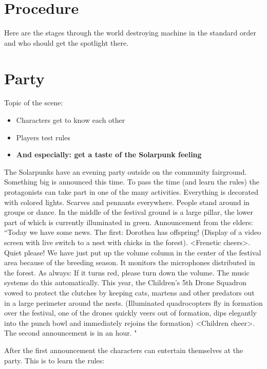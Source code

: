 \section{Procedure}
Here are the stages through the world destroying machine in the standard order and who should get the spotlight there.



\section{Party}

Topic of the scene: 
\begin{itemize}
\item Characters get to know each other
\item Players test rules
\item \bf{And especially: get a taste of the Solarpunk feeling}
\end{itemize}

The Solarpunks have an evening party outside on the community fairground. Something big is announced this time. To pass the time (and learn the rules) the protagonists can take part in one of the many activities. 
Everything is decorated with colored lights. Scarves and pennants everywhere. People stand around in groups or dance. In the middle of the festival ground is a large pillar, the lower part of which is currently illuminated in green.
Announcement from the elders: “Today we have some news. The first: Dorothea has offspring! (Display of a video screen with live switch to a nest with chicks in the forest). <Frenetic cheers>. Quiet please! We have just put up the volume column in the center of the festival area because of the breeding season.
It monitors the microphones distributed in the forest.
As always: If it turns red, please turn down the volume. The music systems do this automatically. This year, the Children's 5th Drone Squadron vowed to protect the clutches by keeping cats, martens and other predators out in a large perimeter around the nests. (Illuminated quadrocopters fly in formation over the festival, one of the drones quickly veers out of formation, dips elegantly into the punch bowl and immediately rejoins the formation) <Children cheer>.
The second announcement is in an hour.
"

After the first announcement the characters can entertain themselves at the party. This is to learn the rules:

